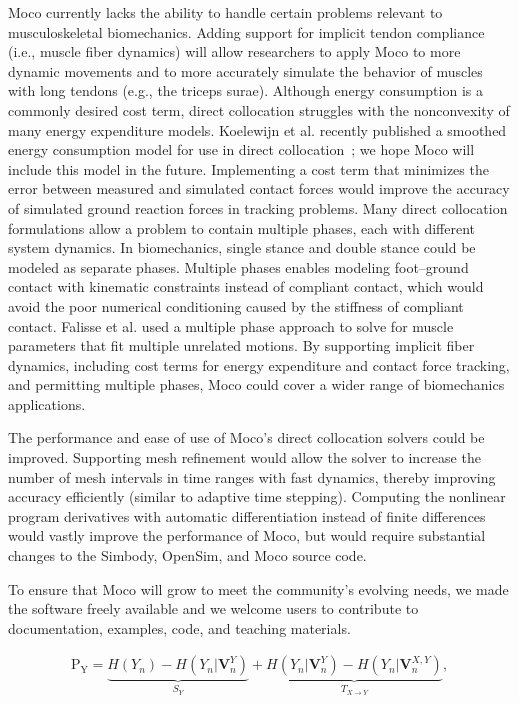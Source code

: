 \documentclass[10pt,letterpaper]{article}
\begin{document}
Moco currently lacks the ability to handle certain problems relevant to musculoskeletal biomechanics. Adding support for implicit tendon compliance (i.e., muscle fiber dynamics) will allow researchers to apply Moco to more dynamic movements and to more accurately simulate the behavior of muscles with long tendons (e.g., the triceps surae). Although energy consumption is a commonly desired cost term, direct collocation struggles with the nonconvexity of many energy expenditure models. Koelewijn et al. recently published a smoothed energy consumption model for use in direct collocation~\cite{Koelewijn:2019}; we hope Moco will include this model in the future. Implementing a cost term that minimizes the error between measured and simulated contact forces would improve the accuracy of simulated ground reaction forces in tracking problems. Many direct collocation formulations allow a problem to contain multiple phases, each with different system dynamics. In biomechanics, single stance and double stance could be modeled as separate phases. Multiple phases enables modeling foot–ground contact with kinematic constraints instead of compliant contact, which would avoid the poor numerical conditioning caused by the stiffness of compliant contact. Falisse et al. used a multiple phase approach to solve for muscle parameters that fit multiple unrelated motions. By supporting implicit fiber dynamics, including cost terms for energy expenditure and contact force tracking, and permitting multiple phases, Moco could cover a wider range of biomechanics applications.

The performance and ease of use of Moco’s direct collocation solvers could be improved. Supporting mesh refinement would allow the solver to increase the number of mesh intervals in time ranges with fast dynamics, thereby improving accuracy efficiently (similar to adaptive time stepping). Computing the nonlinear program derivatives with automatic differentiation instead of finite differences would vastly improve the performance of Moco, but would require substantial changes to the Simbody, OpenSim, and Moco source code.

To ensure that Moco will grow to meet the community’s evolving needs, we made the software freely available and we welcome users to contribute to documentation, examples, code, and teaching materials.




\begin{eqnarray}
\label{eq:schemeP}
	\mathrm{P_Y} = \underbrace{H(Y_n) - H(Y_n|\mathbf{V}^{Y}_{n})}_{S_Y} + \underbrace{H(Y_n|\mathbf{V}^{Y}_{n})- H(Y_n|\mathbf{V}^{X,Y}_{n})}_{T_{X\rightarrow Y}},
\end{eqnarray}
\end{document}
